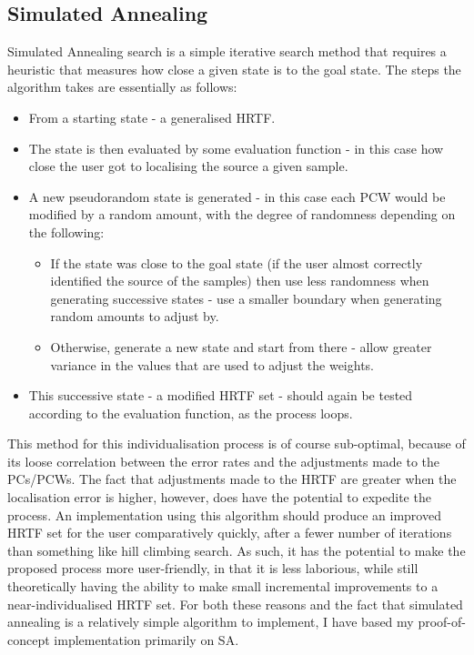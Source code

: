 \subsection{Simulated Annealing}
Simulated Annealing \citep{vanLaarhoven1987} search is a simple iterative search method that requires a heuristic that measures how close a given state is to the goal state. The steps the algorithm takes are essentially as follows:
\begin{itemize}
\item From a starting state - a generalised HRTF.
\item The state is then evaluated by some evaluation function - in this case how close the user got to localising the source a given sample.
\item A new pseudorandom state is generated - in this case each PCW would be modified by a random amount, with the degree of randomness depending on the following:
\begin{itemize}
\item If the state was close to the goal state (if the user almost correctly identified the source of the samples) then use less randomness when generating successive states - use a smaller boundary when generating random amounts to adjust by.
\item Otherwise, generate a new state and start from there - allow greater variance in the values that are used to adjust the weights. 
\end{itemize}
\item This successive state - a modified HRTF set - should again be tested according to the evaluation function, as the process loops. 
\end{itemize}

This method for this individualisation process is of course sub-optimal, because of its loose correlation between the error rates and the adjustments made to the PCs/PCWs. The fact that adjustments made to the HRTF are greater when the localisation error is higher, however, does have the potential to expedite the process. An implementation using this algorithm should produce an improved HRTF set for the user comparatively quickly, after a fewer number of iterations than something like hill climbing search. As such, it has the potential to make the proposed process more user-friendly, in that it is less laborious, while still theoretically having the ability to make small incremental improvements to a near-individualised HRTF set. For both these reasons and the fact that simulated annealing is a relatively simple algorithm to implement, I have based my proof-of-concept implementation primarily on SA.  

